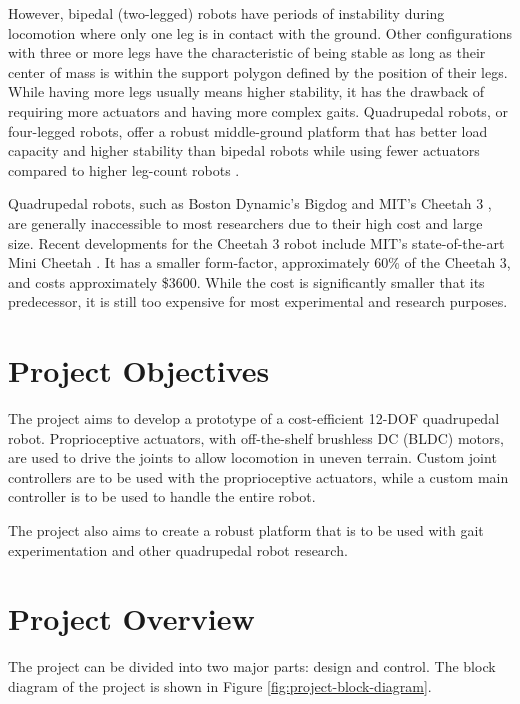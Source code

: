 \documentclass[english]{upeeei}
\begin{document}
However, bipedal (two-legged) robots have periods of instability during locomotion where only one leg is in contact with the ground. Other configurations with three or more legs have the characteristic of being stable as long as their center of mass is within the support polygon defined by the position of their legs. While having more legs usually means higher stability, it has the drawback of requiring more actuators and having more complex gaits. Quadrupedal robots, or four-legged robots, offer a robust middle-ground platform that has better load capacity and higher stability than bipedal robots while using fewer actuators compared to higher leg-count robots \cite{quadrobotlegs}.

Quadrupedal robots, such as Boston Dynamic's Bigdog \cite{bigdog} and MIT's Cheetah 3 \cite{mitcheetah3}, are generally inaccessible to most researchers due to their high cost and large size. Recent developments for the Cheetah 3 robot include MIT's state-of-the-art Mini Cheetah \cite{minicheetah}. It has a smaller form-factor, approximately 60\% of the Cheetah 3, and costs approximately \$3600. While the cost is significantly smaller that its predecessor, it is still too expensive for most experimental and research purposes.

\section{Project Objectives}

The project aims to develop a prototype of a cost-efficient 12-DOF quadrupedal robot. Proprioceptive actuators, with off-the-shelf brushless DC (BLDC) motors, are used to drive the joints to allow locomotion in uneven terrain. Custom joint controllers are to be used with the proprioceptive actuators, while a custom main controller is to be used to handle the entire robot.

The project also aims to create a robust platform that is to be used with gait experimentation and other quadrupedal robot research.

\section{Project Overview}

The project can be divided into two major parts: design and control. The block diagram of the project is shown in Figure \ref{fig:project-block-diagram}.
\end{document}
